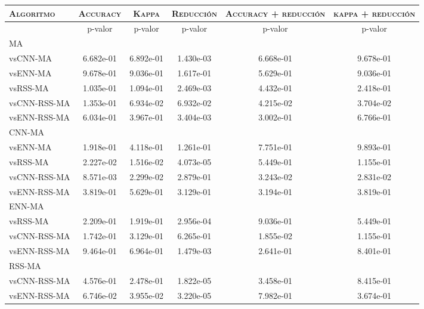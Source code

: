 \begin{table}[h!]
\centering
\begin{adjustbox}{max width =\textwidth}
\begin{tabular}{l c c c c c}
\hline
	\textsc{Algoritmo}
	& \multicolumn{1}{c}{\textsc{Accuracy}}
	& \multicolumn{1}{c}{\textsc{Kappa}}
	& \multicolumn{1}{c}{\textsc{Reducción}} 
	& \multicolumn{1}{c}{\textsc{Accuracy + reducción}} 
	& \multicolumn{1}{c}{\textsc{kappa + reducción}} \\

\hline
\hline

 & p-valor & p-valor & p-valor & p-valor & p-valor \\

MA\\
vsCNN-MA     & 6.682e-01 & 6.892e-01 & 1.430e-03 & 6.668e-01 & 9.678e-01 \\ 
vsENN-MA     & 9.678e-01 & 9.036e-01 & 1.617e-01 & 5.629e-01 & 9.036e-01 \\
vsRSS-MA     & 1.035e-01 & 1.094e-01 & 2.469e-03 & 4.432e-01 & 2.418e-01 \\ 
vsCNN-RSS-MA & 1.353e-01 & 6.934e-02 & 6.932e-02 & 4.215e-02 & 3.704e-02 \\ 
vsENN-RSS-MA & 6.034e-01 & 3.967e-01 & 3.404e-03 & 3.002e-01 & 6.766e-01 \\

\hline

CNN-MA\\
vsENN-MA & 1.918e-01 & 4.118e-01 & 1.261e-01 & 7.751e-01 & 9.893e-01 \\ 
vsRSS-MA & 2.227e-02 & 1.516e-02 & 4.073e-05 & 5.449e-01 & 1.155e-01 \\ 
vsCNN-RSS-MA & 8.571e-03 & 2.299e-02 & 2.879e-01 & 3.243e-02 & 2.831e-02 \\ 
vsENN-RSS-MA & 3.819e-01 & 5.629e-01 & 3.129e-01 & 3.194e-01 & 3.819e-01 \\ 

\hline

ENN-MA\\
vsRSS-MA & 2.209e-01 & 1.919e-01 & 2.956e-04 & 9.036e-01 & 5.449e-01 \\ 
vsCNN-RSS-MA & 1.742e-01 & 3.129e-01 & 6.265e-01 & 1.855e-02 & 1.155e-01 \\ 
vsENN-RSS-MA & 9.464e-01 & 6.964e-01 & 1.479e-03 & 2.641e-01 & 8.401e-01 \\ 

\hline

RSS-MA\\
vsCNN-RSS-MA & 4.576e-01 & 2.478e-01 & 1.822e-05 & 3.458e-01 & 8.415e-01 \\
vsENN-RSS-MA & 6.746e-02 & 3.955e-02 & 3.220e-05 & 7.982e-01 & 3.674e-01 \\ 


\end{tabular}
\end{adjustbox}
\end{table}
